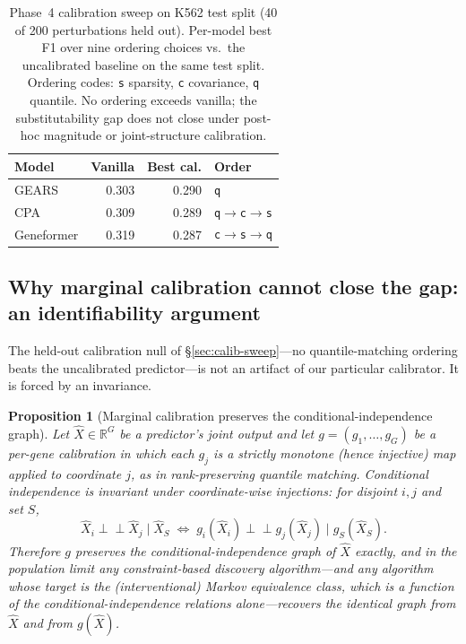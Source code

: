 \documentclass{article}
\theoremstyle{plain}
\newtheorem{proposition}[theorem]{Proposition}
\theoremstyle{definition}
\theoremstyle{remark}
\begin{document}
\begin{table}[h]
\centering
\small
\begin{tabular}{lrrl}
\toprule
\textbf{Model} & \textbf{Vanilla} & \textbf{Best cal.} & \textbf{Order} \\
\midrule
GEARS       & 0.303 & 0.290 & \texttt{q} \\
CPA         & 0.309 & 0.289 & \texttt{q$\to$c$\to$s} \\
Geneformer  & 0.319 & 0.287 & \texttt{c$\to$s$\to$q} \\
\bottomrule
\end{tabular}
\caption{Phase~4 calibration sweep on K562 test split (40 of 200 perturbations held out). Per-model best F1 over nine ordering choices vs.\ the uncalibrated baseline on the same test split. Ordering codes: \texttt{s} sparsity, \texttt{c} covariance, \texttt{q} quantile. No ordering exceeds vanilla; the substitutability gap does not close under post-hoc magnitude or joint-structure calibration.}
\label{tab:calib_sweep}
\end{table}

\subsection{Why marginal calibration cannot close the gap: an identifiability argument}
\label{sec:identifiability}
The held-out calibration null of \S\ref{sec:calib-sweep}---no quantile-matching ordering beats the uncalibrated predictor---is not an artifact of our particular calibrator. It is forced by an invariance.

\begin{proposition}[Marginal calibration preserves the conditional-independence graph]
\label{prop:ci-invariance}
Let $\hat X \in \mathbb{R}^{G}$ be a predictor's joint output and let $g=(g_1,\dots,g_G)$ be a per-gene calibration in which each $g_j$ is a strictly monotone (hence injective) map applied to coordinate $j$, as in rank-preserving quantile matching. Conditional independence is invariant under coordinate-wise injections: for disjoint $i,j$ and set $S$,
\[
\hat X_i \perp\!\!\!\perp \hat X_j \mid \hat X_S \;\iff\; g_i(\hat X_i) \perp\!\!\!\perp g_j(\hat X_j) \mid g_S(\hat X_S).
\]
Therefore $g$ preserves the conditional-independence graph of $\hat X$ exactly, and in the population limit any constraint-based discovery algorithm---and any algorithm whose target is the (interventional) Markov equivalence class, which is a function of the conditional-independence relations alone---recovers the identical graph from $\hat X$ and from $g(\hat X)$.
\end{proposition}
\end{document}
